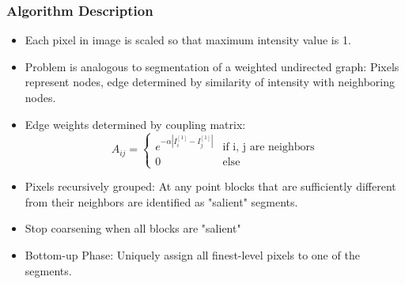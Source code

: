\documentclass[8pt]{beamer}
\begin{document}
\begin{frame}
\frametitle{Algorithm Description}
\begin{minipage}{.5\textwidth}
\begin{itemize}
\item Each pixel in image is scaled so that maximum intensity value is 1.
\item Problem is analogous to segmentation of a weighted undirected graph: Pixels represent nodes, edge determined by similarity of intensity with neighboring nodes.
\item Edge weights determined by coupling matrix: 
$$ A_{ij} = \left\{ \begin{array}{lr} e^{-\alpha \left| I_i^{[1]}-I_j^{[1]} \right|} & \text{if i, j are neighbors} \\
0 & \text{else} \end{array} \right. $$
\item Pixels recursively grouped: At any point blocks that are sufficiently different from their neighbors are identified as "salient" segments.
\item Stop coarsening when all blocks are "salient"
\item Bottom-up Phase: Uniquely assign all finest-level pixels to one of the segments.
\end{itemize}
\end{minipage}
\hspace{.05\textwidth}
\begin{minipage}{.4\textwidth}

\end{minipage}
\end{frame}
\end{document}
